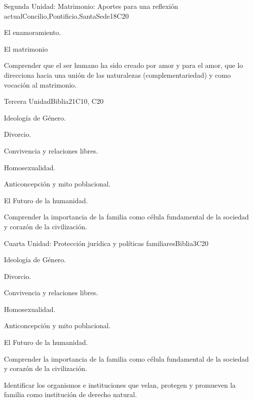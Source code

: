 \begin{syllabus}
\begin{unit}{}{Segunda Unidad: Matrimonio: Aportes para una reflexión actual}{Concilio,Pontificio,SantaSede}{18}{C20}
\begin{topics}
	\item El enamoramiento.
    \item El matrimonio	
\end{topics}
\begin{learningoutcomes}
	\item Comprender que el ser humano ha sido creado por amor y para el amor, que lo direcciona hacia una unión de las naturalezas (complementariedad) y como vocación al matrimonio.
\end{learningoutcomes}
\end{unit}

\begin{unit}{}{Tercera Unidad}{Biblia}{21}{C10, C20}
\begin{topics}
	\item Ideología de Género.
	\item Divorcio.
	\item Convivencia y relaciones libres.
	\item Homosexualidad.
	\item Anticoncepción y mito poblacional.
	\item El Futuro de la humanidad.
\end{topics}
\begin{learningoutcomes}
	\item Comprender la importancia de la familia como célula fundamental de la sociedad y corazón de la civilización.
\end{learningoutcomes}
\end{unit}

\begin{unit}{}{Cuarta Unidad: Protección jurídica y políticas familiares}{Biblia}{3}{C20}
\begin{topics}
	\item Ideología de Género.
	\item Divorcio.
	\item Convivencia y relaciones libres.
	\item Homosexualidad.
	\item Anticoncepción y mito poblacional.
	\item El Futuro de la humanidad.
\end{topics}
\begin{learningoutcomes}
	\item Comprender la importancia de la familia como célula fundamental de la sociedad y corazón de la civilización.
    \item Identificar los organismos e instituciones que velan, protegen y promueven la familia como institución de derecho natural.
\end{learningoutcomes}
\end{unit}



\begin{coursebibliography}
\end{coursebibliography}

\end{syllabus}
